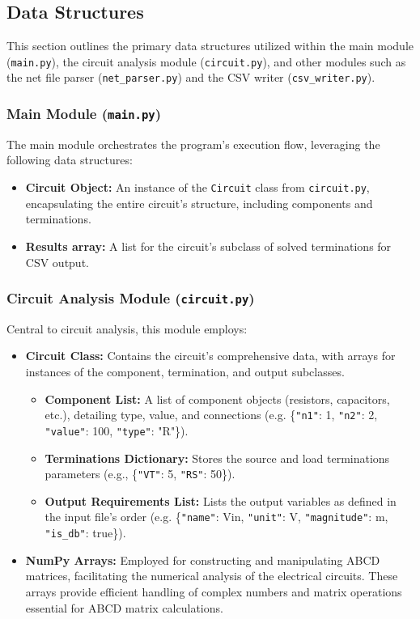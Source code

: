 \documentclass[a4paper]{article}
\begin{document}
\subsection{Data Structures}
This section outlines the primary data structures utilized within the main module (\texttt{main.py}), the circuit analysis module (\texttt{circuit.py}), and other modules such as the net file parser (\texttt{net\_parser.py}) and the CSV writer (\texttt{csv\_writer.py}).

\subsubsection*{Main Module (\texttt{main.py})}
The main module orchestrates the program's execution flow, leveraging the following data structures:
\begin{itemize}
    \item \textbf{Circuit Object:} An instance of the \texttt{Circuit} class from \texttt{circuit.py}, encapsulating the entire circuit's structure, including components and terminations.
    \item \textbf{Results array:} A list for the circuit's subclass of solved terminations for CSV output. 
\end{itemize}

\subsubsection*{Circuit Analysis Module (\texttt{circuit.py})}
Central to circuit analysis, this module employs:
\begin{itemize}
    \item \textbf{Circuit Class:} Contains the circuit's comprehensive data, with arrays for instances of the component, termination, and output subclasses.
    \begin{itemize}
        \item \textbf{Component List:} A list of component objects (resistors, capacitors, etc.), detailing type, value, and connections (e.g. \{\texttt{"n1"}: 1, \texttt{"n2"}: 2, \texttt{"value"}: 100, \texttt{"type"}: "R"\}).
        \item \textbf{Terminations Dictionary:} Stores the source and load terminations parameters (e.g., \{\texttt{"VT"}: 5, \texttt{"RS"}: 50\}).
        \item \textbf{Output Requirements List:} Lists the output variables as defined in the input file's order (e.g. \{\texttt{"name"}: Vin, \texttt{"unit"}: V, \texttt{"magnitude"}: m, \texttt{"is\_db"}: true\}).
    \end{itemize}
    \item \textbf{NumPy Arrays:} Employed for constructing and manipulating ABCD matrices, facilitating the numerical analysis of the electrical circuits. These arrays provide efficient handling of complex numbers and matrix operations essential for ABCD matrix calculations.
\end{itemize}
\end{document}
